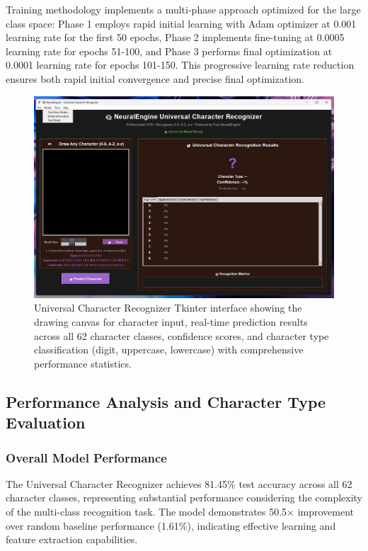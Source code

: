 \documentclass[11pt,a4paper]{report}
\begin{document}
Training methodology implements a multi-phase approach optimized for the large class space: Phase 1 employs rapid initial learning with Adam optimizer at 0.001 learning rate for the first 50 epochs, Phase 2 implements fine-tuning at 0.0005 learning rate for epochs 51-100, and Phase 3 performs final optimization at 0.0001 learning rate for epochs 101-150. This progressive learning rate reduction ensures both rapid initial convergence and precise final optimization.

\begin{figure}[H]
\centering
\includegraphics[width=\textwidth]{universal_character_recognizer_interface.png}
\caption{Universal Character Recognizer Tkinter interface showing the drawing canvas for character input, real-time prediction results across all 62 character classes, confidence scores, and character type classification (digit, uppercase, lowercase) with comprehensive performance statistics.}
\label{fig:universal_interface}
\end{figure}

\subsection{Performance Analysis and Character Type Evaluation}

\subsubsection{Overall Model Performance}

The Universal Character Recognizer achieves 81.45\% test accuracy across all 62 character classes, representing substantial performance considering the complexity of the multi-class recognition task. The model demonstrates 50.5× improvement over random baseline performance (1.61\%), indicating effective learning and feature extraction capabilities.
\end{document}
